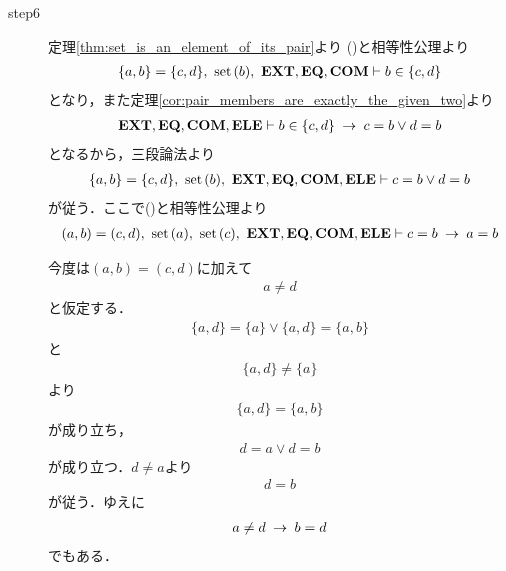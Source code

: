 \begin{sketch}
\begin{description}
			\item[step6] 定理\ref{thm:set_is_an_element_of_its_pair}より
				()と相等性公理より
				\begin{align}
					\{a,b\} = \{c,d\},\ \operatorname*{set}\hspace{0.15em}(b),\ \mbox{{\bf EXT}},\mbox{{\bf EQ}},\mbox{\bf COM} \vdash b \in \{c,d\}
				\end{align}
				となり，また定理\ref{cor:pair_members_are_exactly_the_given_two}より
				\begin{align}
					\mbox{{\bf EXT}},\mbox{{\bf EQ}},\mbox{\bf COM},\mbox{{\bf ELE}} \vdash b \in \{c,d\} \hspace{0.25em}\rightarrow\hspace{0.25em} c = b \vee d = b
				\end{align}
				となるから，三段論法より
				\begin{align}
					\{a,b\} = \{c,d\},\ \set{b},\ \EXTAX,\EQAX,\COMAX,\ELEAX \vdash c = b \vee d = b
					\label{fom:equality_of_ordered_pairs_10}
				\end{align}
				が従う．ここで()と相等性公理より
				\begin{align}
					(a,b) = (c,d),\ \set{a},\ \set{c},\ \EXTAX,\EQAX,\COMAX,\ELEAX \vdash c = b \rarrow a = b
				\end{align}
		
		今度は$(a,b) = (c,d)$に加えて
		\begin{align}
			a \neq d
		\end{align}
		と仮定する．
		\begin{align}
			\{a,d\} = \{a\} \vee \{a,d\} = \{a,b\}
		\end{align}
		と
		\begin{align}
			\{a,d\} \neq \{a\}
		\end{align}
		より
		\begin{align}
			\{a,d\} = \{a,b\}
		\end{align}
		が成り立ち，
		\begin{align}
			d = a \vee d = b
		\end{align}
		が成り立つ．$d \neq a$より
		\begin{align}
			d = b
		\end{align}
		が従う．ゆえに
		\begin{align}
			a \neq d \hspace{0.25em}\rightarrow\hspace{0.25em} b = d
		\end{align}
		でもある．
		\QED
		\end{description}
	\end{sketch}